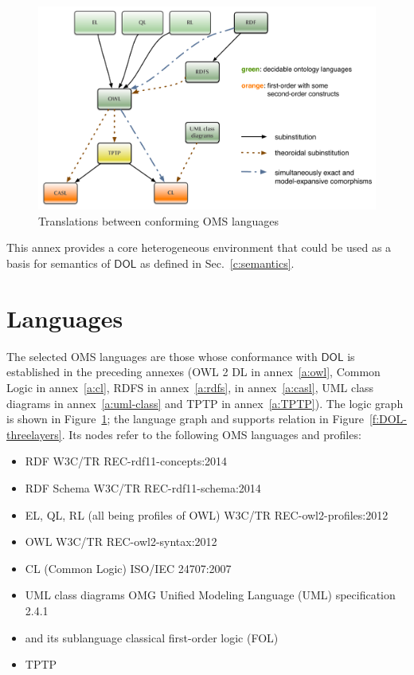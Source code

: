 \documentclass[10pt,fleqn,final]{scrreprt}
\newcommand*{\DOL}{\ensuremath{\mathsf{DOL}}\xspace}
\newcommand{\annexrefname}{annex}
\newcommand{\figurerefname}{Figure}
\newcommand{\aref}[1]{\annexrefname~\ref{#1}}
\newcommand{\fref}[1]{\figurerefname~\ref{#1}}
\newcommand{\sclause}[1]{\section{#1}}
\newcommand{\nisref}[1]{#1}
\newenvironment{definitions}[0]{\medskip }{}
\begin{document}
\begin{definitions}
\begin{figure}
  \centering
  \includegraphics[width=\textwidth]{illustrations/ontograph-standards-new}
  \caption{Translations between conforming OMS languages}
  \label{fig:ontograph-standards}
\end{figure}

This annex provides a core heterogeneous environment that could be used as a basis for 
semantics of \DOL as defined in Sec.~\ref{c:semantics}.

\sclause{Languages}
 
 The selected OMS languages
are those whose conformance with \DOL is established in the preceding annexes (OWL 2 DL in \aref{a:owl}, Common Logic in \aref{a:cl}, RDFS in \aref{a:rdfs},
\CASL in \aref{a:casl}, UML class diagrams in \aref{a:uml-class} and TPTP in \aref{a:TPTP}).  The logic graph is shown in \fref{fig:ontograph-standards}; the language graph and supports relation in \fref{f:DOL-threelayers}.  Its nodes refer to the following OMS languages and profiles:
\begin{itemize}
\item RDF \nisref{W3C/TR REC-rdf11-concepts:2014}
\item RDF Schema \nisref{W3C/TR REC-rdf11-schema:2014}
\item EL, QL, RL (all being profiles of OWL) \nisref{W3C/TR REC-owl2-profiles:2012}
\item OWL \nisref{W3C/TR REC-owl2-syntax:2012}
\item CL (Common Logic) \nisref{ISO/IEC 24707:2007}
\item UML class diagrams \nisref{OMG Unified Modeling Language (UML) specification 2.4.1}
\item \CASL \cite{CASL-RM} and its sublanguage classical first-order logic (FOL)
\item TPTP
\end{itemize}


\end{definitions}
\end{document}
